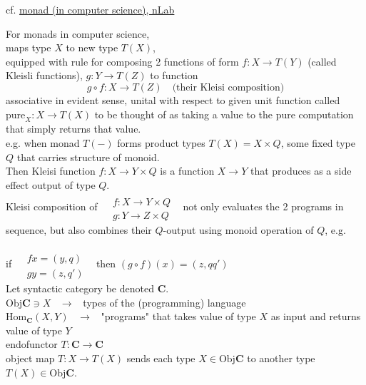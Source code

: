 cf. \href{https://ncatlab.org/nlab/show/monad+%28in+computer+science%29}{monad (in computer science), nLab}

For monads in computer science, \\
maps type $X$ to new type $T(X)$, \\
equipped with rule for composing 2 functions of form $f:X \to T(Y)$ (called Kleisli functions), $g:Y \to T(Z)$ to function 
\[
g\circ f : X \to T(Z) \quad \text{(their Kleisi composition)}
\]
associative in evident sense, unital with respect to given unit function called $\text{pure}_X: X \to T(X)$ to be thought of as taking a value to the pure computation that simply returns that value. \\

e.g. when monad $T(-)$ forms product types $T(X) = X \times Q$, some fixed type $Q$ that carries structure of monoid. \\
Then Kleisi function $f:X \to Y \times Q$ is a function $X\to Y$  that produces as a side effect output of type $Q$. \\
Kleisi composition of $\begin{aligned} &  \quad \\
	& f:X\to Y\times Q \\
	& g: Y \to Z\times Q\end{aligned}$ \, not only evaluates the 2 programs in sequence, but also combines their $Q$-output using monoid operation of $Q$, e.g.
	
	if $\begin{aligned} & \quad \\ 
	& fx = (y, q) \\ 
	& gy = (z,q')\end{aligned}$  \, then $(g\circ f)(x) = (z, qq')$ \\
	
Let syntactic category be denoted $\mathbf{C}$. \\

$\text{Obj}{\mathbf{C}} \ni X$ \quad \, $\to $ \, types of the (programming) language \\
$\text{Hom}_{\mathbf{C}}(X,Y)$ \quad \, $\to $ \, "programs" that takes value of type $X$ as input and returns value of type $Y$ \\

endofunctor $T: \mathbf{C} \to \mathbf{C}$ \\
object map $T:X \to T(X)$ sends each type $X\in \text{Obj}{\mathbf{C}}$ to another type $T(X) \in \text{Obj}{\mathbf{C}}$.  \\

